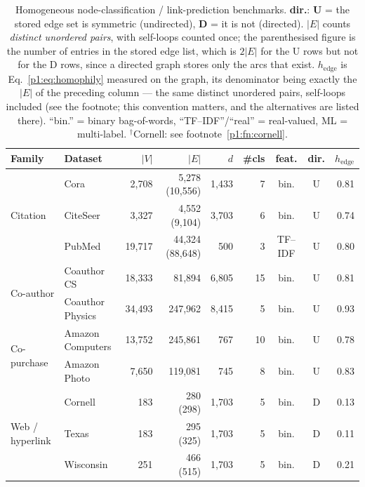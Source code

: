 \begin{table}[htbp]
\centering
\small
\setlength{\tabcolsep}{4pt}
\caption{Homogeneous node-classification / link-prediction benchmarks.
\textbf{dir.}: \textbf{U} = the stored edge set is symmetric (undirected),
\textbf{D} = it is not (directed). $|E|$ counts \emph{distinct unordered pairs}, with
self-loops counted once; the parenthesised figure is the number of entries in the stored
edge list, which is $2|E|$ for the U rows but not for the D rows, since a directed graph
stores only the arcs that exist. $h_{\mathrm{edge}}$ is Eq.~\eqref{p1:eq:homophily}
measured on the graph, its denominator being exactly the $|E|$ of the preceding column ---
the same distinct unordered pairs, self-loops included (see the footnote; this convention
matters, and the alternatives are listed there). ``bin.'' = binary bag-of-words,
``TF--IDF''/``real'' = real-valued, ML = multi-label.
$^{\dagger}$Cornell: see footnote~\ref{p1:fn:cornell}.}
\label{p1:tab:nodecls}
\begin{tabular}{llrrrrccr}
\toprule
Family & Dataset & $|V|$ & $|E|$ & $d$ & \#cls & feat. & dir. & $h_{\mathrm{edge}}$ \\
\midrule
\multirow{3}{*}{Citation}
 & Cora              & 2{,}708  & 5{,}278 (10{,}556)   & 1{,}433 & 7  & bin.    & U & 0.81 \\
 & CiteSeer          & 3{,}327  & 4{,}552 (9{,}104)    & 3{,}703 & 6  & bin.    & U & 0.74 \\
 & PubMed            & 19{,}717 & 44{,}324 (88{,}648)  & 500     & 3  & TF--IDF & U & 0.80 \\
\midrule
\multirow{2}{*}{Co-author}
 & Coauthor CS       & 18{,}333 & 81{,}894             & 6{,}805 & 15 & bin.    & U & 0.81 \\
 & Coauthor Physics  & 34{,}493 & 247{,}962            & 8{,}415 & 5  & bin.    & U & 0.93 \\
\midrule
\multirow{2}{*}{Co-purchase}
 & Amazon Computers  & 13{,}752 & 245{,}861            & 767     & 10 & bin.    & U & 0.78 \\
 & Amazon Photo      & 7{,}650  & 119{,}081            & 745     & 8  & bin.    & U & 0.83 \\
\midrule
\multirow{5}{*}{Web / hyperlink}
 & Cornell           & 183      & 280 (298)            & 1{,}703 & 5  & bin.    & D & 0.13\rlap{$^{\dagger}$} \\
 & Texas             & 183      & 295 (325)            & 1{,}703 & 5  & bin.    & D & 0.11 \\
 & Wisconsin         & 251      & 466 (515)            & 1{,}703 & 5  & bin.    & D & 0.21 \\

\end{tabular}
\end{table}
